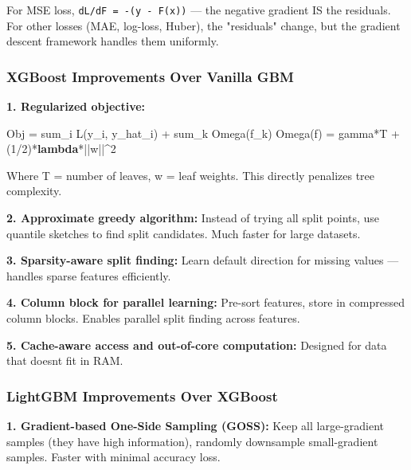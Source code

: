 \documentclass[11pt]{article}
\newenvironment{Shaded}{\begin{snugshade}}{\end{snugshade}}
\newcommand{\DecValTok}[1]{\textcolor[rgb]{0.96,0.45,0.00}{#1}}
\newcommand{\KeywordTok}[1]{\textcolor[rgb]{0.81,0.81,0.76}{\textbf{#1}}}
\newcommand{\NormalTok}[1]{\textcolor[rgb]{0.81,0.81,0.76}{#1}}
\newcommand{\OperatorTok}[1]{\textcolor[rgb]{0.81,0.81,0.76}{#1}}
\begin{document}
For MSE loss, \texttt{dL/dF\ =\ -(y\ -\ F(x))} --- the negative gradient IS the residuals. For other losses (MAE, log-loss, Huber), the "residuals" change, but the gradient descent framework handles them uniformly.

\subsubsection{XGBoost Improvements Over Vanilla GBM}\label{xgboost-improvements-over-vanilla-gbm}

\textbf{1. Regularized objective:}


\begin{Shaded}
\begin{Highlighting}[]
\NormalTok{Obj }\OperatorTok{=}\NormalTok{ sum\_i L(y\_i, y\_hat\_i) }\OperatorTok{+}\NormalTok{ sum\_k Omega(f\_k)}
\NormalTok{Omega(f) }\OperatorTok{=}\NormalTok{ gamma}\OperatorTok{*}\NormalTok{T }\OperatorTok{+}\NormalTok{ (}\DecValTok{1}\OperatorTok{/}\DecValTok{2}\NormalTok{)}\OperatorTok{*}\KeywordTok{lambda}\OperatorTok{*||}\NormalTok{w}\OperatorTok{||\^{}}\DecValTok{2}
\end{Highlighting}
\end{Shaded}

Where T = number of leaves, w = leaf weights. This directly penalizes tree complexity.

\textbf{2. Approximate greedy algorithm:}
Instead of trying all split points, use quantile sketches to find split candidates. Much faster for large datasets.

\textbf{3. Sparsity-aware split finding:}
Learn default direction for missing values --- handles sparse features efficiently.

\textbf{4. Column block for parallel learning:}
Pre-sort features, store in compressed column blocks. Enables parallel split finding across features.

\textbf{5. Cache-aware access and out-of-core computation:}
Designed for data that doesn\textquotesingle t fit in RAM.

\subsubsection{LightGBM Improvements Over XGBoost}\label{lightgbm-improvements-over-xgboost}

\textbf{1. Gradient-based One-Side Sampling (GOSS):}
Keep all large-gradient samples (they have high information), randomly downsample small-gradient samples. Faster with minimal accuracy loss.
\end{document}
